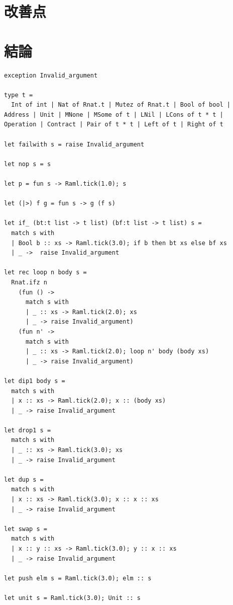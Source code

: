 \documentclass{kuisthesis}
\begin{document}
\section{改善点}

\section{結論}\label{sec-conclusion}

\acknowledgments

\nocite{*}



\appendix[付録 : 本研究において実装したRAMLライブラリのソースコード]
\begin{lstlisting}[language=caml]
exception Invalid_argument

type t =
  Int of int | Nat of Rnat.t | Mutez of Rnat.t | Bool of bool | Address | Unit | MNone | MSome of t | LNil | LCons of t * t | Operation | Contract | Pair of t * t | Left of t | Right of t

let failwith s = raise Invalid_argument

let nop s = s

let p = fun s -> Raml.tick(1.0); s

let (|>) f g = fun s -> g (f s)

let if_ (bt:t list -> t list) (bf:t list -> t list) s =
  match s with
  | Bool b :: xs -> Raml.tick(3.0); if b then bt xs else bf xs
  | _ ->  raise Invalid_argument

let rec loop n body s =
  Rnat.ifz n
    (fun () ->
      match s with
      | _ :: xs -> Raml.tick(2.0); xs
      | _ -> raise Invalid_argument)
    (fun n' ->
      match s with
      | _ :: xs -> Raml.tick(2.0); loop n' body (body xs)
      | _ -> raise Invalid_argument)

let dip1 body s =
  match s with
  | x :: xs -> Raml.tick(2.0); x :: (body xs)
  | _ -> raise Invalid_argument

let drop1 s =
  match s with
  | _ :: xs -> Raml.tick(3.0); xs
  | _ -> raise Invalid_argument

let dup s =
  match s with
  | x :: xs -> Raml.tick(3.0); x :: x :: xs
  | _ -> raise Invalid_argument

let swap s =
  match s with
  | x :: y :: xs -> Raml.tick(3.0); y :: x :: xs
  | _ -> raise Invalid_argument

let push elm s = Raml.tick(3.0); elm :: s

let unit s = Raml.tick(3.0); Unit :: s


\end{lstlisting}
\end{document}

